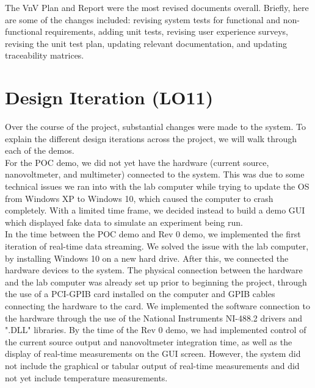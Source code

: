 \documentclass{article}
\begin{document}
The VnV Plan and Report were the most revised documents overall. Briefly, here are some of the changes included: revising system tests for functional and non-functional requirements, adding unit tests, revising user experience surveys, revising the unit test plan, updating relevant documentation, and updating traceability matrices.

\section{Design Iteration (LO11)}


\noindent Over the course of the project, substantial changes were made to the system. To explain the different design iterations across the project, we will walk through each of the demos. \\ 

\noindent For the POC demo, we did not yet have the hardware (current source, nanovoltmeter, and multimeter) connected to the system. This was due to some technical issues we ran into with the lab computer while trying to update the OS from Windows XP to Windows 10, which caused the computer to crash completely. With a limited time frame, we decided instead to build a demo GUI which displayed fake data to simulate an experiment being run. \\

\noindent In the time between the POC demo and Rev 0 demo, we implemented the first iteration of real-time data streaming. We solved the issue with the lab computer, by installing Windows 10 on a new hard drive. After this, we connected the hardware devices to the system. The physical connection between the hardware and the lab computer was already set up prior to beginning the project, through the use of a PCI-GPIB card installed on the computer and GPIB cables connecting the hardware to the card. We implemented the software connection to the hardware through the use of the National Instruments NI-488.2 drivers and ".DLL" libraries. By the time of the Rev 0 demo, we had implemented control of the current source output and nanovoltmeter integration time, as well as the display of real-time measurements on the GUI screen. However, the system did not include the graphical or tabular output of real-time measurements and did not yet include temperature measurements. \\
\end{document}
